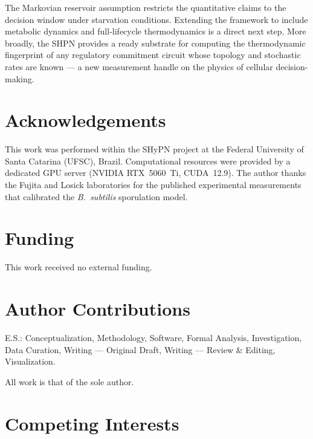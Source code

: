 \documentclass[11pt,a4paper]{article}
\begin{document}
The Markovian reservoir assumption restricts the quantitative claims to
the decision window under starvation conditions.
Extending the framework to include metabolic dynamics and full-lifecycle
thermodynamics is a direct next step.
More broadly, the SHPN provides a ready substrate for computing the
thermodynamic fingerprint of any regulatory commitment circuit whose
topology and stochastic rates are known --- a new measurement handle on
the physics of cellular decision-making.

\section*{Acknowledgements}

This work was performed within the SHyPN project at the Federal University
of Santa Catarina (UFSC), Brazil.
Computational resources were provided by a dedicated GPU server
(NVIDIA RTX~5060~Ti, CUDA~12.9).
The author thanks the Fujita and Losick laboratories for the published
experimental measurements that calibrated the \textit{B.~subtilis}
sporulation model.

\section*{Funding}

This work received no external funding.

\section*{Author Contributions}

\noindent E.S.: Conceptualization, Methodology, Software, Formal Analysis,
Investigation, Data Curation, Writing --- Original Draft,
Writing --- Review \& Editing, Visualization.

All work is that of the sole author.

\section*{Competing Interests}
\end{document}
